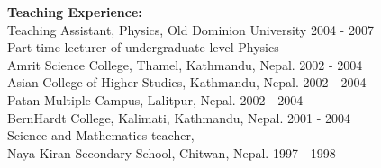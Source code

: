 \documentclass[10pt, letterpaper]{article}
\begin{document}
		{\bf Teaching Experience:} \\
		Teaching Assistant, Physics, Old Dominion University \hfill 2004 - 2007 \\
		Part-time lecturer of undergraduate level Physics\\
		\hspace*{3 mm} Amrit Science College, Thamel, Kathmandu, Nepal. \hfill 2002 - 2004 \\
		\hspace*{3 mm} Asian College of Higher Studies, Kathmandu, Nepal. \hfill 2002 - 2004 \\
		\hspace*{3 mm} Patan Multiple Campus, Lalitpur, Nepal. \hfill 2002 - 2004 \\
		\hspace*{3 mm} BernHardt College, Kalimati, Kathmandu, Nepal. \hfill 2001 - 2004 \\
		Science and Mathematics teacher, \\
		\hspace*{3 mm} Naya Kiran Secondary School, Chitwan, Nepal.               \hfill 1997 - 1998
\end{document}
